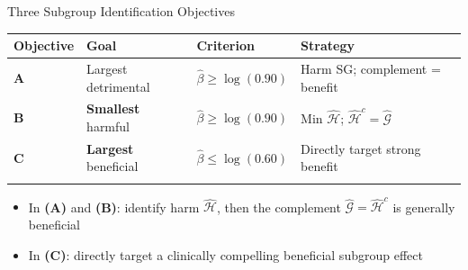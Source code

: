 \documentclass[
  ignorenonframetext,
  aspectratio=169]{beamer}
\providecommand{\tightlist}{%
  \setlength{\itemsep}{0pt}\setlength{\parskip}{0pt}}
\begin{document}
\begin{frame}{Three Subgroup Identification Objectives}
\label{three-subgroup-identification-objectives}
\small

\begin{longtable}[]{@{}
  >{\centering\arraybackslash}p{}
  >{\raggedright\arraybackslash}p{}
  >{\raggedright\arraybackslash}p{}
  >{\raggedright\arraybackslash}p{}@{}}
\toprule\noalign{}
\begin{minipage}[b]{\linewidth}\centering
Objective
\end{minipage} & \begin{minipage}[b]{\linewidth}\raggedright
Goal
\end{minipage} & \begin{minipage}[b]{\linewidth}\raggedright
Criterion
\end{minipage} & \begin{minipage}[b]{\linewidth}\raggedright
Strategy
\end{minipage} \\
\midrule\noalign{}
\endhead
\textbf{A} & Largest detrimental & \(\hat{\beta} \geq \log(0.90)\) &
Harm SG; complement = benefit \\
\textbf{B} & \textbf{Smallest} harmful & \(\hat{\beta} \geq \log(0.90)\)
& Min \(\hat{\mathcal{H}}\);
\(\hat{\mathcal{H}}^{c} = \hat{\mathcal{G}}\) \\
\textbf{C} & \textbf{Largest} beneficial &
\(\hat{\beta} \leq \log(0.60)\) & Directly target strong benefit \\
\bottomrule\noalign{}
\end{longtable}

\normalsize

\medskip

\begin{itemize}
\tightlist
\item
  In \textbf{(A)} and \textbf{(B)}: identify harm \(\hat{\mathcal{H}}\),
  then the complement \(\hat{\mathcal{G}} = \hat{\mathcal{H}}^{c}\) is
  generally beneficial
\item
  In \textbf{(C)}: directly target a clinically compelling beneficial
  subgroup effect
\end{itemize}
\end{frame}
\end{document}
